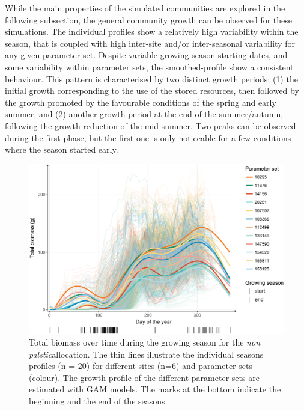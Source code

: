 While the main properties of the simulated communities are explored in the following subsection, the general community growth can be observed for these simulations. The individual profiles show a relatively high variability within the season, that is coupled with high inter-site and/or inter-seasonal variability for any given parameter set.
Despite variable growing-season starting dates, and some variability within parameter sets, the smoothed-profile show a consistent behaviour. This pattern is characterised by two distinct growth periods: (1) the initial growth  corresponding to the use of the stored resources, then followed by the growth promoted by the favourable conditions of the spring and early summer, and (2) another growth period at the end of the summer/autumn, following the growth reduction of the mid-summer. Two peaks can be observed during the first phase, but the first one is only noticeable for a few conditions where the season started early.  

\begin{figure}%
    \includegraphics[width=1\linewidth]{./2_PP/Figures/Comm/biomass_season_non_plastic2.png}%
  \caption[Total biomass over time during the growing season for the \textit{non palstic}allocation.]{Total biomass over time during the growing season for the \textit{non palstic}allocation. The thin lines illustrate the individual seasons profiles (n = 20) for different sites (n=6) and parameter sets (colour). The growth profile of the different parameter sets are estimated with GAM models. The marks at the bottom indicate the beginning and the end of the seasons.}
  \label{fg:species_per_plant}
\end{figure}

